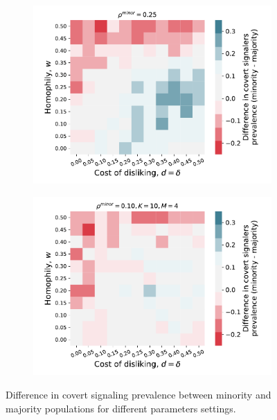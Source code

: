 \documentclass[11pt,letterpaper]{article}
\begin{document}
\begin{figure}[H]
  \begin{subfigure}{0.48\textwidth}
    \centering
    \includegraphics[width=\textwidth]{Figures/covert_signalers_diff_0p25.pdf}
  \end{subfigure}
  \hfill
  \begin{subfigure}{0.48\textwidth}
    \centering
    \includegraphics[width=\textwidth]{Figures/covert_signalers_diff_0p10_K=10_M=4.pdf}
  \end{subfigure}
  \caption{Difference in covert signaling prevalence between minority and
  majority populations for different parameters settings.}
  \label{fig:covert-signaling-minority-heatmap}
\end{figure}
\end{document}
